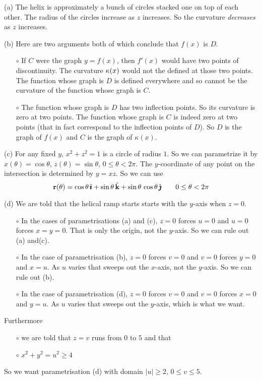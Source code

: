 \begin{solution}  (a) The helix is approximately a bunch of circles
stacked one on top of each other. The radius of the circles increase
as $z$ increases. So the curvature \emph{decreases} as $z$ increases.

\noindent (b) Here are two arguments both of which conclude that $f(x)$
is $D$. 

\begin{itemize}\itemsep1pt \parskip0pt  %
\item[$\circ$] If $C$ were the graph $y=f(x)$, then $f'(x)$ would
have two points of discontinuity. The curvature $\kappa(x)$ would not the
defined at those two points. The function whose graph is $D$ is defined
everywhere and so cannot be the curvature of the function whose graph is $C$. 

\item[$\circ$] The function whose graph is $D$ has two inflection points.
So its curvature is zero at two points. The function whose graph is $C$
is indeed zero at two points (that in fact correspond to the inflection points
of $D$). So $D$ is the graph of $f(x)$ and $C$ is the graph of $\kappa(x)$.
\end{itemize} 

\noindent (c) For any fixed $y$, $x^2+z^2=1$ is a circle of radius $1$.
So we can parametrize it by $x(\theta)=\cos\theta$, 
$z(\theta)=\sin\theta$, $0\le\theta<2\pi$. The $y$-coordinate of any point on
the intersection is determined by $y=xz$. So we can use
\begin{equation*}
\mathbf{r}(\theta) = \cos\theta\,\hat{\pmb{\imath}} +\sin\theta\,\hat{\mathbf{k}} + \sin\theta\,\cos\theta\,\hat{\pmb{\jmath}}
\qquad 0\le\theta<2\pi
\end{equation*}

\noindent (d)
We are told that the helical ramp starts starts with the $y$-axis when
$z=0$.
\begin{itemize}\itemsep1pt \parskip0pt  %
\item[$\circ$] 
In the cases of parametrisations (a) and (c),
$z=0$ forces $u=0$ and $u=0$ forces $x=y=0$. That is only the
origin, not the $y$-axis. So we can rule out (a) and(c).

\item[$\circ$] 
In the case of parametrisation (b), 
$z=0$ forces $v=0$ and $v=0$ forces $y=0$ and $x=u$. As $u$ varies 
that sweeps out the $x$-axis, not the $y$-axis. 
So we can rule out (b).

\item[$\circ$] 
In the case of parametrisation (d), 
$z=0$ forces $v=0$ and $v=0$ forces $x=0$ and $y=u$. As $u$ varies 
that sweeps out the $y$-axis, which is what we want.
\end{itemize} 
Furthermore
\begin{itemize}\itemsep1pt \parskip0pt  %
\item[$\circ$] 
we are told that $z=v$ runs from $0$ to $5$ and that
\item[$\circ$] 
$x^2+y^2=u^2\ge 4$
\end{itemize} 
So we want parametrisation (d) with domain $|u|\ge 2$, $0\le v\le 5$.


\end{solution}

